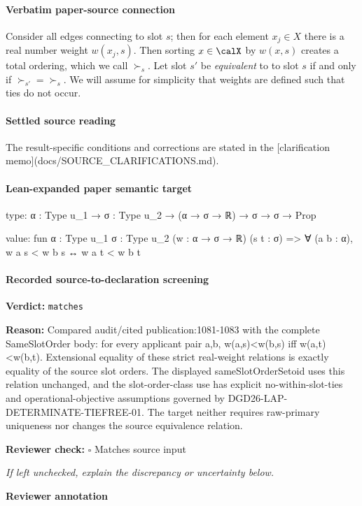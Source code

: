 \documentclass[10pt]{article}
\newcommand{\reviewerbox}{%
  \par\noindent\fbox{\parbox{0.96\linewidth}{\rule{0pt}{0.38in}}}\par
}
\newcommand{\reviewmatch}[1]{%
  \par\noindent\textbf{Reviewer check:} $\square$\; #1\par
  \noindent\emph{If left unchecked, explain the discrepancy or uncertainty below.}\par
}
\begin{document}
\paragraph{Verbatim paper-source connection}
\begin{ReviewVerbatim}
Consider all edges connecting to slot $s$; then for each element  $x_j \in X$ there is a real number weight $w(x_j, s)$. Then sorting $x \in \calX$ by $w(x,s)$ creates a total ordering, which we call $\succ_s$. Let slot $s'$ be \textit{equivalent} to
to slot $s$ if and only if $\succ_{s'} = \succ_{s}$.
We will assume for simplicity that weights are defined such that ties do not occur.
\end{ReviewVerbatim}

\paragraph{Settled source reading}
The result-\allowbreak{}specific conditions and corrections are stated in the [clarification memo](docs/\allowbreak{}SOURCE\_\allowbreak{}CLARIFICATIONS.\allowbreak{}md).\allowbreak{}

\paragraph{Lean-expanded paper semantic target}
\begin{ReviewVerbatim}
type:
{α : Type u_1} → {σ : Type u_2} → (α → σ → ℝ) → σ → σ → Prop

value:
fun {α : Type u_1} {σ : Type u_2} (w : α → σ → ℝ) (s t : σ) => ∀ (a b : α), w a s < w b s ↔ w a t < w b t
\end{ReviewVerbatim}


\paragraph{Recorded source-to-declaration screening}
\textbf{Verdict:} \texttt{matches}
\\
{\raggedright
\textbf{Reason:} Compared audit/\allowbreak{}cited publication:\allowbreak{}1081-\allowbreak{}1083 with the complete SameSlotOrder body:\allowbreak{} for every applicant pair a,b, w(a,s)<w(b,s) iff w(a,t)<w(b,t).\allowbreak{} Extensional equality of these strict real-\allowbreak{}weight relations is exactly equality of the source slot orders.\allowbreak{} The displayed sameSlotOrderSetoid uses this relation unchanged, and the slot-\allowbreak{}order-\allowbreak{}class use has explicit no-\allowbreak{}within-\allowbreak{}slot-\allowbreak{}ties and operational-\allowbreak{}objective assumptions governed by DGD26-\allowbreak{}LAP-\allowbreak{}DETERMINATE-\allowbreak{}TIEFREE-\allowbreak{}01.\allowbreak{} The target neither requires raw-\allowbreak{}primary uniqueness nor changes the source equivalence relation.\allowbreak{}
\par}
\reviewmatch{Matches source input}
\noindent\textbf{Reviewer annotation}\par
\reviewerbox
\clearpage
\hypertarget{paper-prerequisite-b883b62c7f37ad70}{}
\end{document}
